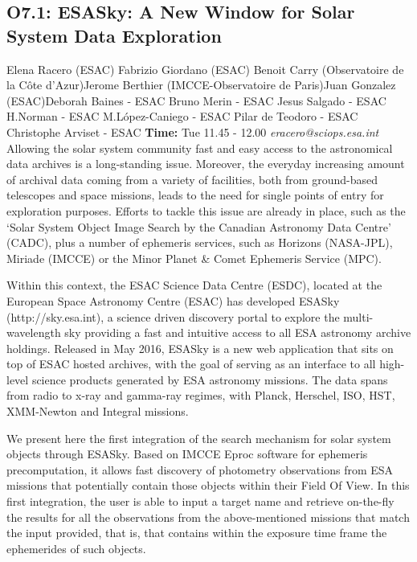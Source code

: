 \documentclass{report}
\begin{document}
\subsection*{O7.1: ESASky: A New Window for Solar System Data Exploration}
\bigskip
Elena Racero (ESAC) \newline Fabrizio Giordano (ESAC) \newline  Benoit Carry (Observatoire de la Côte d'Azur)\newline  Jerome Berthier (IMCCE-Observatoire de Paris)\newline Juan Gonzalez (ESAC)\newline  Deborah Baines - ESAC
Bruno Merin - ESAC
Jesus Salgado - ESAC
H.Norman - ESAC
M.López-Caniego - ESAC
Pilar  de Teodoro - ESAC
Christophe Arviset - ESAC\newline\newline
{\bf Time:} Tue 11.45 - 12.00\newline
\newline
{\it eracero@sciops.esa.int}\newline
\newline\newline
Allowing the solar system community fast and easy access to the astronomical data archives is a long-standing issue. Moreover, the everyday increasing amount of archival data coming from a variety of facilities, both from ground-based telescopes and space missions, leads to the need for single points of entry for exploration purposes. Efforts to tackle this issue are already in place, such as the ‘Solar System Object Image Search by the Canadian Astronomy Data Centre’ (CADC), plus a number of ephemeris services, such as Horizons (NASA-JPL), Miriade (IMCCE) or the Minor Planet \& Comet Ephemeris Service (MPC).

Within this context, the ESAC Science Data Centre (ESDC), located at the European Space Astronomy Centre (ESAC) has developed ESASky (http://sky.esa.int), a science driven discovery portal to explore the multi-wavelength sky providing a fast and intuitive access to all ESA astronomy archive holdings. Released in May 2016, ESASky is a new web application that sits on top of ESAC hosted archives, with the goal of serving as an interface to all high-level science products generated by ESA astronomy missions. The data spans from radio to x-ray and gamma-ray regimes, with Planck, Herschel, ISO, HST, XMM-Newton and Integral missions. 

We present here the first integration of the search mechanism for solar system objects through ESASky. Based on IMCCE Eproc software for ephemeris precomputation, it allows fast discovery of photometry observations from ESA missions that potentially contain those objects within their Field Of View. In this first integration, the user is able to input a target name and retrieve on-the-fly the results for all the observations from the above-mentioned missions that match the input provided, that is, that contains within the exposure time frame the ephemerides of such objects. 
\end{document}
